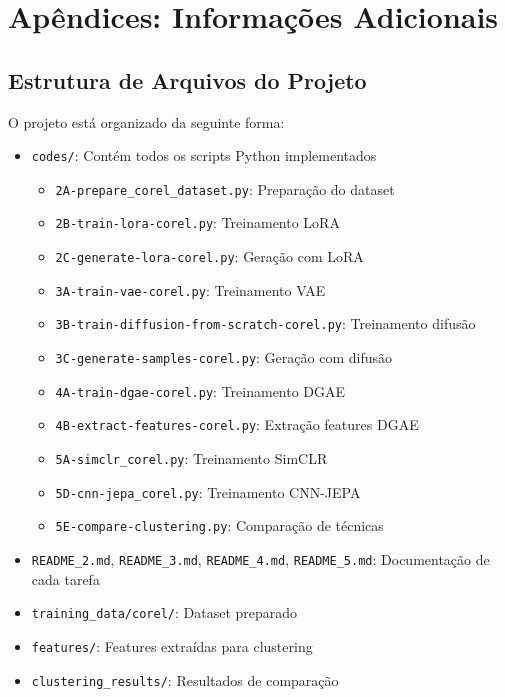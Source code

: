 
\appendix
\chapter{Apêndices: Informações Adicionais}
\label{chap:anexos}

\section{Estrutura de Arquivos do Projeto}

O projeto está organizado da seguinte forma:

\begin{itemize}
    \item \texttt{codes/}: Contém todos os scripts Python implementados
    \begin{itemize}
        \item \texttt{2A-prepare\_corel\_dataset.py}: Preparação do dataset
        \item \texttt{2B-train-lora-corel.py}: Treinamento LoRA
        \item \texttt{2C-generate-lora-corel.py}: Geração com LoRA
        \item \texttt{3A-train-vae-corel.py}: Treinamento VAE
        \item \texttt{3B-train-diffusion-from-scratch-corel.py}: Treinamento difusão
        \item \texttt{3C-generate-samples-corel.py}: Geração com difusão
        \item \texttt{4A-train-dgae-corel.py}: Treinamento DGAE
        \item \texttt{4B-extract-features-corel.py}: Extração features DGAE
        \item \texttt{5A-simclr\_corel.py}: Treinamento SimCLR
        \item \texttt{5D-cnn-jepa\_corel.py}: Treinamento CNN-JEPA
        \item \texttt{5E-compare-clustering.py}: Comparação de técnicas
    \end{itemize}
    \item \texttt{README\_2.md}, \texttt{README\_3.md}, \texttt{README\_4.md}, \texttt{README\_5.md}: Documentação de cada tarefa
    \item \texttt{training\_data/corel/}: Dataset preparado
    \item \texttt{features/}: Features extraídas para clustering
    \item \texttt{clustering\_results/}: Resultados de comparação
\end{itemize}

